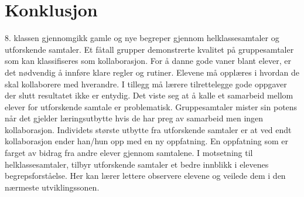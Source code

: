 \documentclass[main.tex]{subfiles}
\begin{document}
\section*{Konklusjon}
\label{sec:4}

8. klassen gjennomgikk gamle og nye begreper gjennom helklassesamtaler og utforskende 
samtaler. Et fåtall grupper demonstrerte kvalitet på gruppesamtaler som kan
klassifiseres som kollaborasjon. For å danne gode vaner blant elever, er det nødvendig 
å innføre klare regler og rutiner. Elevene må opplæres i hvordan de skal kollaborere 
med hverandre. I tillegg må lærere tilrettelegge gode oppgaver der slutt resultatet 
ikke er entydig.  Det viste seg at å kalle et samarbeid mellom elever for utforskende samtale
er problematisk. Gruppesamtaler mister sin potens når det gjelder læringsutbytte hvis 
de har preg av samarbeid men ingen kollaborasjon. Individets største utbytte fra 
utforskende samtaler er at ved endt kollaborasjon ender han/hun opp med en ny oppfatning. 
En oppfatning som er farget av bidrag fra andre elever gjennom samtalene.
I motsetning til helklassesamtaler, tilbyr utforskende samtaler et bedre innblikk
i elevenes begrepsforståelse. Her kan lærer lettere observere elevene og veilede
dem i den nærmeste utviklingssonen.
\end{document}
